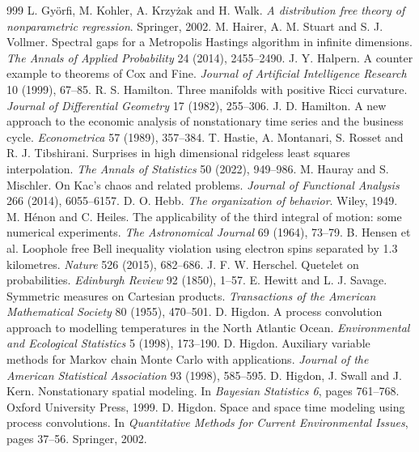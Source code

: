 \begin{thebibliography}{999}
 L. Gy\"orfi, M. Kohler, A. Krzy\.zak and H. Walk. \emph{A distribution free theory of nonparametric regression}. Springer, 2002.
 M. Hairer, A. M. Stuart and S. J. Vollmer. Spectral gaps for a Metropolis Hastings algorithm in infinite dimensions. \emph{The Annals of Applied Probability} 24 (2014), 2455--2490.
 J. Y. Halpern. A counter example to theorems of Cox and Fine. \emph{Journal of Artificial Intelligence Research} 10 (1999), 67--85.
 R. S. Hamilton. Three manifolds with positive Ricci curvature. \emph{Journal of Differential Geometry} 17 (1982), 255--306.
 J. D. Hamilton. A new approach to the economic analysis of nonstationary time series and the business cycle. \emph{Econometrica} 57 (1989), 357--384.
 T. Hastie, A. Montanari, S. Rosset and R. J. Tibshirani. Surprises in high dimensional ridgeless least squares interpolation. \emph{The Annals of Statistics} 50 (2022), 949--986.
 M. Hauray and S. Mischler. On Kac's chaos and related problems. \emph{Journal of Functional Analysis} 266 (2014), 6055--6157.
 D. O. Hebb. \emph{The organization of behavior}. Wiley, 1949.
 M. H\'enon and C. Heiles. The applicability of the third integral of motion: some numerical experiments. \emph{The Astronomical Journal} 69 (1964), 73--79.
 B. Hensen et al. Loophole free Bell inequality violation using electron spins separated by 1.3 kilometres. \emph{Nature} 526 (2015), 682--686.
 J. F. W. Herschel. Quetelet on probabilities. \emph{Edinburgh Review} 92 (1850), 1--57.
 E. Hewitt and L. J. Savage. Symmetric measures on Cartesian products. \emph{Transactions of the American Mathematical Society} 80 (1955), 470--501.
 D. Higdon. A process convolution approach to modelling temperatures in the North Atlantic Ocean. \emph{Environmental and Ecological Statistics} 5 (1998), 173--190.
 D. Higdon. Auxiliary variable methods for Markov chain Monte Carlo with applications. \emph{Journal of the American Statistical Association} 93 (1998), 585--595.
 D. Higdon, J. Swall and J. Kern. Nonstationary spatial modeling. In \emph{Bayesian Statistics 6}, pages 761--768. Oxford University Press, 1999.
 D. Higdon. Space and space time modeling using process convolutions. In \emph{Quantitative Methods for Current Environmental Issues}, pages 37--56. Springer, 2002.

\end{thebibliography}
